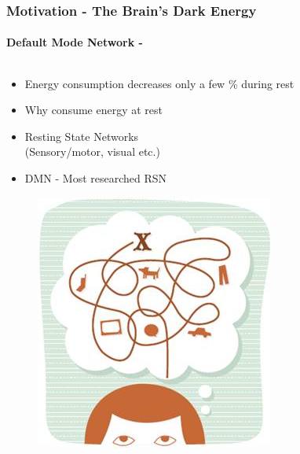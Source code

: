 \documentclass[9pt,presentation]{beamer}   %
\begin{document}
\begin{frame}[t]
\frametitle{Motivation - The Brain’s Dark Energy}
\framesubtitle{Default Mode Network - \cite{Raichle}}

\begin{columns}
    \begin{column}{0.48\textwidth}



\vspace{0.3cm}
\begin{itemize}
\item Energy consumption decreases only a few \% during rest
\vspace{0.3cm}
\item Why consume energy at rest
\vspace{0.3cm}
\item Resting State Networks\\
(Sensory/motor, visual etc.)
\vspace{0.3cm}
\item DMN - Most researched RSN
\end{itemize}
\begin{figure}[H]
\begin{center}
\includegraphics[scale=0.2]{wandering-mind}
\end{center}
\end{figure} 

    \end{column}
    \begin{column}{0.48\textwidth}


\end{column}
\end{columns}
\end{frame}
\end{document}
